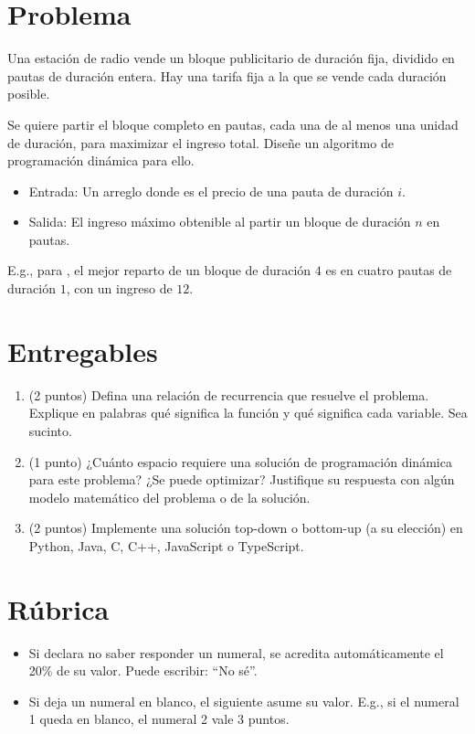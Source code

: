 \section{Problema}
Una estación de radio vende un bloque publicitario de duración fija, dividido en pautas de duración entera. Hay una tarifa fija a la que se vende cada duración posible.

Se quiere partir el bloque completo en pautas, cada una de al menos una unidad de duración, para maximizar el ingreso total. Diseñe un algoritmo de programación dinámica para ello.

\begin{itemize}
  \item Entrada: Un arreglo  donde  es el precio de una pauta de duración $i$.
  \item Salida: El ingreso máximo obtenible al partir un bloque de duración $n$ en pautas.
\end{itemize}

E.g., para , el mejor reparto de un bloque de duración $4$ es en cuatro pautas de duración $1$, con un ingreso de $12$.

\section{Entregables}

\begin{enumerate}
  \item (2 puntos) Defina una relación de recurrencia que resuelve el problema. Explique en palabras qué significa la función y qué significa cada variable. Sea sucinto.
  \item (1 punto) ¿Cuánto espacio requiere una solución de programación dinámica para este problema? ¿Se puede optimizar? Justifique su respuesta con algún modelo matemático del problema o de la solución.
  \item (2 puntos) Implemente una solución top-down o bottom-up (a su elección) en Python, Java, C, C++, JavaScript o TypeScript.
\end{enumerate}

\section{Rúbrica}

\begin{itemize}
  \item Si declara no saber responder un numeral, se acredita automáticamente el 20\% de su valor. Puede escribir: ``No sé''.
  \item Si deja un numeral en blanco, el siguiente asume su valor. E.g., si el numeral 1 queda en blanco, el numeral 2 vale 3 puntos.
\end{itemize}

